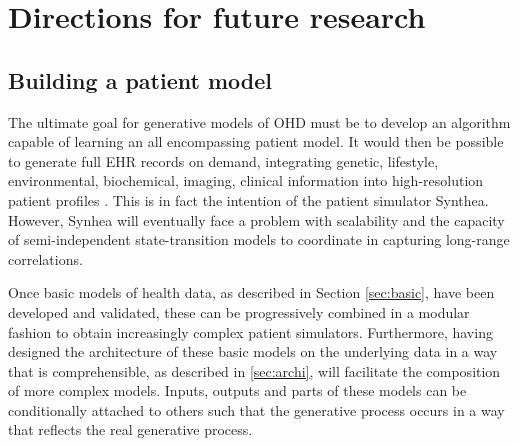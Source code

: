 \section{Directions for future research}
\subsection{Building a patient model}
The ultimate goal for generative models of OHD must be to develop an algorithm capable of learning an all encompassing patient model. It would then be possible to generate full EHR records on demand, integrating genetic, lifestyle, environmental, biochemical, imaging, clinical information into high-resolution patient profiles \cite{Capobianco2020}. This is in fact the intention of the patient simulator Synthea. However, Synhea will eventually face a problem with scalability and the capacity of semi-independent state-transition models to coordinate in capturing long-range correlations.\par

Once basic models of health data, as described in Section \ref{sec:basic}, have been developed and validated, these can be progressively combined in a modular fashion to obtain increasingly complex patient simulators. Furthermore, having designed the architecture of these basic models on the underlying data in a way that is comprehensible, as described in \ref{sec:archi}, will facilitate the composition of more complex models. Inputs, outputs and parts of these models can be conditionally attached to others such that the generative process occurs in a way that reflects the real generative process.

